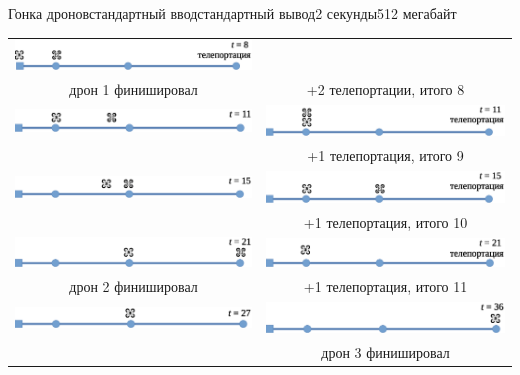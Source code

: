 \begin{problem}{Гонка дронов}{стандартный ввод}{стандартный вывод}{2 секунды}{512 мегабайт}
\begin{center}
\begin{tabular}{cc}
\includegraphics[scale=0.5]{sample-3-09.eps}\\
дрон 1 финишировал &+2 телепортации, итого 8\\[0.5cm]
\includegraphics[scale=0.5]{sample-3-10.eps}&
\includegraphics[scale=0.5]{sample-3-11.eps}\\
&+1 телепортация, итого 9\\[0.5cm]
\includegraphics[scale=0.5]{sample-3-12.eps}&
\includegraphics[scale=0.5]{sample-3-13.eps}\\
&+1 телепортация, итого 10\\[0.5cm]
\includegraphics[scale=0.5]{sample-3-14.eps}&
\includegraphics[scale=0.5]{sample-3-15.eps}\\
дрон 2 финишировал&+1 телепортация, итого 11\\[0.5cm]
\includegraphics[scale=0.5]{sample-3-16.eps}&
\includegraphics[scale=0.5]{sample-3-17.eps}\\
&дрон 3 финишировал\\
\end{tabular}
\end{center}




\end{problem}

